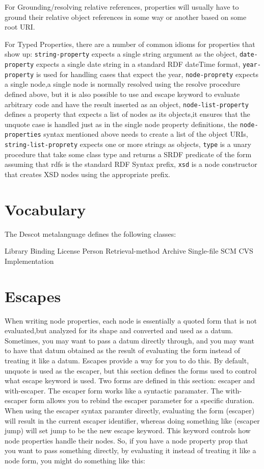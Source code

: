 For Grounding/resolving relative references, properties will usually 
have to ground their relative object references in some way or another
based on some root URI.

For Typed Properties, there are a number of common idioms for properties 
that show up: {\tt string-property} expects a single string argument as 
the object, {\tt date-property} expects a single date string in a standard 
RDF dateTime format, {\tt year-property} is used for handling cases that 
expect the year, {\tt node-proprety} expects a single node,a single node is 
normally resolved using the resolve procedure defined above, but it is also
possible to use and escape keyword to evaluate arbitrary code and have the 
result inserted as an object, {\tt node-list-property} defines a property 
that expects a list of nodes as its objects,it ensures that the unquote 
case is handled just as in the single node property definitions, the 
{\tt node-properties} syntax mentioned above needs to create a list of 
the object URIs, {\tt string-list-proprety} expects one or more 
strings as objects, {\tt type} is a unary procedure that take some class type 
and returns a SRDF predicate of the form assuming that rdfs is the 
standard RDF Syntax prefix, {\tt xsd} is a node constructor that creates XSD 
nodes using the appropriate prefix.


\section{Vocabulary}{}%
The Descot metalanguage defines the following classes:

\unorderedlist
\li Library
\li Binding
\li License
\li Person
\li Retrieval-method
\li Archive
\li Single-file
\li SCM
\li CVS
\li Implementation
\endunorderedlist

\section{Escapes}{}%
When writing node properties, each node is essentially a quoted form 
that is not evaluated,but analyzed for its shape and converted and 
used as a datum. Sometimes, you may want to pass a datum directly through, 
and you may want to have that datum obtained as the result of evaluating
the form instead of treating it like a datum. Escapes provide a way for 
you to do this. By default, unquote is used as the escaper, but this 
section defines the forms used to control what escape keyword is used.
Two forms are defined in this section: escaper and with-escaper. 
The escaper form works like a syntactic paramater. The with-escaper 
form allows you to rebind the escaper parameter for a specific
duration.
When using the escaper syntax paramter directly, evaluating the 
form (escaper) will result in the current escaper identifier, whereas 
doing something like (escaper jump) will set jump to be the new escape
keyword. This keyword controls how node properties handle their nodes. 
So, if you have a node property prop that you want to pass something 
directly, by evaluating it instead of treating it like a node form,
you might do something like this:

